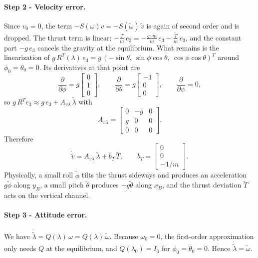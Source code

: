 \paragraph{Step 2 - Velocity error.}
Since $v_0 = 0$, the term $-S(\omega) v = -S(\tilde\omega)\,\tilde v$ is again of second order and is dropped.
The thrust term is linear: $-\tfrac{T}{m}\,e_3 = -\tfrac{g\cdot m}{m}\,e_3 - \tfrac{\tilde T}{m}\,e_3$, and the constant part $-g\, e_3$ cancels the gravity at the equilibrium.
What remains is the linearization of $g\, R^T(\lambda)\, e_3 = g\,(-\sin\theta,\ \sin\phi\cos\theta,\ \cos\phi\cos\theta)^T$ around $\phi_0 = \theta_0 = 0$.
Its derivatives at that point are
\begin{equation*}
\frac{\partial}{\partial\phi} = g\begin{bmatrix} 0 \\ 1 \\ 0 \end{bmatrix}, \qquad
\frac{\partial}{\partial\theta} = g\begin{bmatrix} -1 \\ 0 \\ 0 \end{bmatrix}, \qquad
\frac{\partial}{\partial\psi} = 0 ,
\end{equation*}
so $g\, R^T e_3 \approx g\, e_3 + A_{v\lambda}\,\tilde\lambda$ with
\begin{equation*}
A_{v\lambda} = \begin{bmatrix} 0 & -g & 0 \\ g & 0 & 0 \\ 0 & 0 & 0 \end{bmatrix}.
\end{equation*}
Therefore
\begin{equation*}
\dot{\tilde v} = A_{v\lambda}\,\tilde\lambda + b_T\,\tilde T, \qquad b_T = \begin{bmatrix} 0 \\ 0 \\ -1/m \end{bmatrix}.
\end{equation*}
Physically, a small roll $\tilde\phi$ tilts the thrust sideways and produces an acceleration $g\tilde\phi$ along $y_B$, a small pitch $\tilde\theta$ produces $-g\tilde\theta$ along $x_B$, and the thrust deviation $\tilde T$ acts on the vertical channel.

\paragraph{Step 3 - Attitude error.}
We have $\dot{\tilde\lambda} = Q(\lambda)\,\omega = Q(\lambda)\,\tilde\omega$.
Because $\omega_0 = 0$, the first-order approximation only needs $Q$ at the equilibrium, and $Q(\lambda_0) = I_3$ for $\phi_0 = \theta_0 = 0$.
Hence $\dot{\tilde\lambda} = \tilde\omega$.

